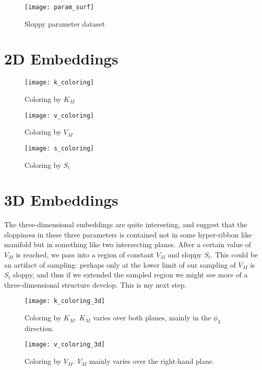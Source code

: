 \documentclass[11pt]{article}
\begin{document}
\begin{figure}[htbp]
  \centering
  \texttt{[image: param\_surf]}
  \caption{Sloppy parameter dataset}
  \label{fig:K}
\end{figure}

\clearpage

\section*{2D Embeddings}

\begin{figure}[htbp]
  \centering
  \texttt{[image: k\_coloring]}
  \caption{Coloring by $K_M$}
  \label{fig:K}
\end{figure}

\begin{figure}[htbp]
  \centering
  \texttt{[image: v\_coloring]}
  \caption{Coloring by $V_M$}
  \label{fig:V}
\end{figure}

\begin{figure}[htbp]
  \centering
  \texttt{[image: s\_coloring]}
  \caption{Coloring by $S_t$}
  \label{fig:S}
\end{figure}

\clearpage

\section*{3D Embeddings}

The three-dimensional embeddings are quite interesting, and suggest that the sloppiness in these three parameters is contained not in some hyper-ribbon like manifold but in something like two intersecting planes. After a certain value of $V_M$ is reached, we pass into a region of constant $V_M$ and sloppy $S_t$. This could be an artifact of sampling: perhaps only at the lower limit of our sampling of $V_M$ is $S_t$ sloppy, and thus if we extended the sampled region we might see more of a three-dimensional structure develop. This is my next step.

\begin{figure}[htbp]
  \centering
  \texttt{[image: k\_coloring\_3d]}
  \caption{Coloring by $K_M$. $K_M$ varies over both planes, mainly in the $\phi_3$ direction.}
  \label{fig:K}
\end{figure}

\begin{figure}[htbp]
  \centering
  \texttt{[image: v\_coloring\_3d]}
  \caption{Coloring by $V_M$. $V_M$ mainly varies over the right-hand plane.}
  \label{fig:V}
\end{figure}
\end{document}
